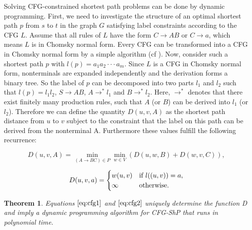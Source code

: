 \documentclass[]{article}
\newtheorem{theorem}{Theorem}[section]
\numberwithin{equation}{section}
\begin{document}
Solving CFG-constrained shortest path problems can be done by dynamic programming. First, we need to investigate the structure of an optimal shortest path $p$ from $s$ to $t$ in the graph $G$ satisfying label constraints according to the CFG $L$. Assume that all rules of $L$ have the form $C \rightarrow AB$ or $C \rightarrow a$, which means $L$ is in Chomsky normal form. Every CFG can be transformed into a CFG in Chomsky normal form by a simple algorithm (cf \cite{Sch08}). Now, consider such a shortest path $p$ with $l(p)=a_1a_2 \cdot\cdot\cdot a_m$. Since $L$ is a CFG in Chomsky normal form, nonterminals are expanded independently and the derivation forms a binary tree. So the label of $p$ can be decomposed into two parts $l_1$ and $l_2$ such that $l(p) = l_1l_2$, $S \rightarrow AB$, $A \rightarrow^* l_1$ and $B \rightarrow^* l_2$. Here, $\rightarrow^*$ denotes that there exist finitely many production rules, such that $A$ (or $B$) can be derived into $l_1$ (or $l_2$). Therefore we can define the quantity $D(u,v,A)$ as the shortest path distance from $u$ to $v$ subject to the constraint that the label on this path can be derived from the nonterminal A. Furthermore these values fulfill the following recurrence:

\begin{equation} \label{eq:cfg1}
D(u, v, A) = \min_{(A\rightarrow BC)\in P} \min_{w\in V} (D(u,w,B) + D(w,v,C)),
\end{equation}

\begin{equation} \label{eq:cfg2}
D(u, v, a) = 
\begin{cases}
w(u,v) & \textup{if } l((u, v)) = a,\\
\infty & \textup{otherwise.}
\end{cases}
\end{equation}

\begin{theorem}
	\label{thm:cfgsp}
	Equations $\eqref{eq:cfg1}$ and $\eqref{eq:cfg2}$ uniquely determine the function D and imply a dynamic programming algorithm for CFG-ShP that runs in polynomial time.
\end{theorem}
\end{document}
